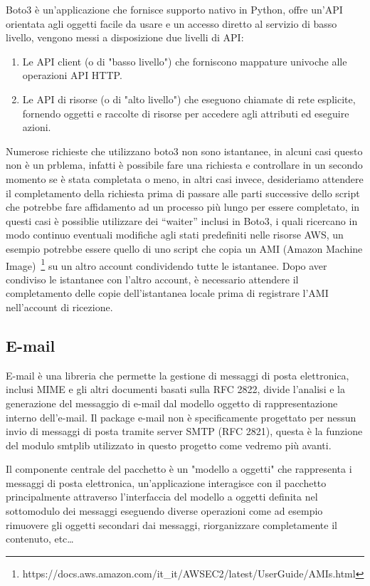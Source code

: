 Boto3 è un'applicazione che fornisce supporto nativo in Python, offre un'API orientata agli oggetti facile da usare e un accesso diretto al 
servizio di basso livello, vengono messi a disposizione due livelli di API: 
\begin{enumerate}
    \item Le API client (o di "basso livello") che forniscono mappature univoche alle operazioni API HTTP.
    \item Le API di risorse (o di "alto livello") che eseguono chiamate di rete esplicite, fornendo oggetti e raccolte di risorse per accedere agli attributi 
    ed eseguire azioni.
\end{enumerate}
Numerose richieste che utilizzano boto3 non sono istantanee, in alcuni casi questo non è un prblema, infatti è possibile fare una richiesta e controllare in un secondo
momento se è stata completata o meno, in altri casi invece, desideriamo attendere il completamento della richiesta prima di passare alle parti successive dello 
script che potrebbe fare affidamento ad un processo più lungo per essere completato, in questi casi è possiblie utilizzare dei ``waiter'' inclusi in Boto3, 
i quali ricercano in modo continuo eventuali modifiche agli stati predefiniti nelle risorse AWS, un esempio potrebbe essere quello di uno script che copia un AMI
(Amazon Machine Image)~\footnote{https://docs.aws.amazon.com/it\_it/AWSEC2/latest/UserGuide/AMIs.html}
su un altro account condividendo tutte le istantanee. Dopo aver condiviso le istantanee con l'altro account, è necessario attendere il completamento delle copie 
dell'istantanea locale prima di registrare l'AMI nell'account di ricezione.


\subsection{E-mail}

E-mail è una libreria che permette la gestione di messaggi di posta elettronica, inclusi MIME e gli altri documenti basati sulla RFC 2822, divide l'analisi e la 
generazione del messaggio di e-mail dal modello oggetto di rappresentazione interno dell'e-mail. 
Il package e-mail non è specificamente progettato per nessun invio di messaggi di posta tramite server SMTP (RFC 2821), questa è la funzione del modulo smtplib 
utilizzato in questo progetto come vedremo più avanti.

Il componente centrale del pacchetto è un "modello a oggetti" che rappresenta i messaggi di posta elettronica, un'applicazione interagisce con il pacchetto 
principalmente attraverso l'interfaccia del modello a oggetti definita nel sottomodulo dei messaggi eseguendo diverse operazioni come ad esempio rimuovere gli 
oggetti secondari dai messaggi, riorganizzare completamente il contenuto, etc\dots

